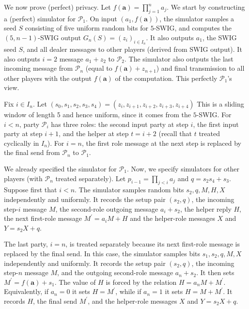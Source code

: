 \documentclass[10pt,a4paper]{article}
\begin{document}
We now prove (perfect) privacy. Let
$f(\mathbf{a})=\prod_{j=1}^{n}a_{j}$. We start by constructing a (perfect) simulator for $\mathcal{P}_{1}$. On input
$(a_{1},f(\mathbf{a}))$, the simulator samples a seed $S$ consisting of five uniform random bits for $5$-SWIG, and computes the $(5,n-1)$-SWIG output
$G_{n}(S)=(z_{i})_{i\in I_{n}}$. It also outputs $a_{1}$, the SWIG seed $S$, and all dealer messages to other players (derived from SWIG output). It also outputs
$i=2$ message $a_{1}+z_{2}$ to $\mathcal{P}_{2}$. The simulator also outputs the last incoming message from $\mathcal{P}_{n}$ (equal to
$f(\mathbf{a})+z_{n+1}$) and final transmission to all other players with the output $f(\mathbf{a})$ of the computation. This perfectly $\mathcal{P}_{1}$’s view.\par




Fix $i\in I_{n}$. Let
$(s_{0},s_{1},s_{2},s_{3},s_{4})=(z_{i},z_{i+1},z_{i+2},z_{i+3},z_{i+4})$
This is a sliding window of length 5 and hence uniform, since it comes from the $5$-SWIG. For $i<n$, party
$\mathcal{P}_{i}$ has three roles: the second input party at step $i$, the first
input party at step $i+1$, and the helper at step $t=i+2$ (recall that $t$
treated cyclically in $I_{n}$). For $i=n$, the first role message at the next
step is replaced by the final send from $\mathcal{P}_{n}$ to $\mathcal{P}_{1}$.\par




We already specified the simulator for $\mathcal{P}_{1}$. Now, we specify simulators for other players (with $\mathcal{P}_{n}$ treated separately).
Let $p_{i-1}=\prod_{j<i}a_{j}$ and $q=s_{2}s_{4}+s_{3}$.
Suppose first that $i<n$. The simulator samples random bits
$s_{2},q,M,H,X$ independently and uniformly. It records the setup
pair $(s_{2},q)$, the incoming step-$i$ message $M$, the second-role outgoing
message $a_{i}+s_{2}$, the helper reply $H$, the next first-role message
$M^{\prime}=a_{i}M+H$
and the helper-role messages $X$ and
$Y=s_{2}X+q$.\par




The last party, $i=n$, is treated separately because its next first-role message
is replaced by the final send. In this case, the simulator samples bits
$s_{1},s_{2},q,M,X$ independently and uniformly. It records the setup
pair $(s_{2},q)$, the incoming step-$n$ message $M$, and the outgoing
second-role message $a_{n}+s_{2}$. It then sets
$M^{\prime}=f(\mathbf{a})+s_{1}.$
The value of $H$ is forced by the relation $H=a_{n}M+M^{\prime}$. Equivalently, if
$a_{n}=0$ it sets $H=M^{\prime}$, while if $a_{n}=1$ it sets $H=M+M^{\prime}$. It records $H$, the
final send $M^{\prime}$, and the helper-role messages $X$ and $Y=s_{2}X+q$.\par
\end{document}
